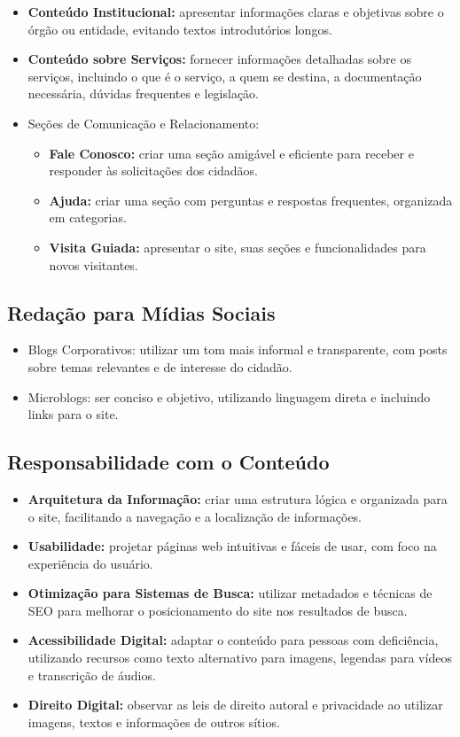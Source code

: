 \documentclass[
  12pt,
  openright,
  twoside,
  a4paper,
  english,
  french,
  spanish,
  brazil
]{abntex2}
\begin{document}
\begin{itemize}
  \item \textbf{Conteúdo Institucional:} apresentar informações claras e objetivas sobre o órgão ou entidade, evitando textos introdutórios longos.
  \item \textbf{Conteúdo sobre Serviços:} fornecer informações detalhadas sobre os serviços, incluindo o que é o serviço, a quem se destina, a documentação necessária, dúvidas frequentes e legislação.
  \item Seções de Comunicação e Relacionamento:
  \begin{itemize}
    \item \textbf{Fale Conosco:} criar uma seção amigável e eficiente para receber e responder às solicitações dos cidadãos.
    \item \textbf{Ajuda:} criar uma seção com perguntas e respostas frequentes, organizada em categorias.
    \item \textbf{Visita Guiada:} apresentar o site, suas seções e funcionalidades para novos visitantes.
  \end{itemize}
\end{itemize}

\subsection{Redação para Mídias Sociais}

\begin{itemize}
  \item Blogs Corporativos: utilizar um tom mais informal e transparente, com posts sobre temas relevantes e de interesse do cidadão.
  \item Microblogs: ser conciso e objetivo, utilizando linguagem direta e incluindo links para o site.
\end{itemize}

\subsection{Responsabilidade com o Conteúdo}

\begin{itemize}
  \item \textbf{Arquitetura da Informação:} criar uma estrutura lógica e organizada para o site, facilitando a navegação e a localização de informações.
  \item \textbf{Usabilidade:} projetar páginas web intuitivas e fáceis de usar, com foco na experiência do usuário.
  \item \textbf{Otimização para Sistemas de Busca:} utilizar metadados e técnicas de SEO para melhorar o posicionamento do site nos resultados de busca.
  \item \textbf{Acessibilidade Digital:} adaptar o conteúdo para pessoas com deficiência, utilizando recursos como texto alternativo para imagens, legendas para vídeos e transcrição de áudios.
  \item \textbf{Direito Digital:} observar as leis de direito autoral e privacidade ao utilizar imagens, textos e informações de outros sítios.
\end{itemize}
\end{document}
